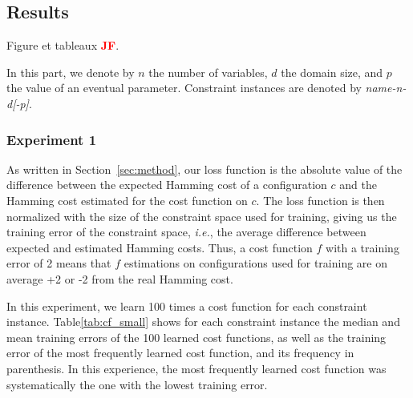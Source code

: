 \documentclass{article}
\newcommand{\ie}{\textit{i.e.}}
\newcommand{\jf}{\textcolor{red}{\bf JF}\xspace}
\begin{document}
\subsection{Results}
Figure et tableaux \jf.

In this part, we denote by $n$ the number of variables, $d$ the domain size, and $p$  the value of an eventual parameter. Constraint instances are denoted by \textit{name-n-d[-p]}.

\subsubsection{Experiment 1}


As written in  Section~\ref{sec:method}, our loss function is the absolute value of the difference between the expected Hamming cost of a  configuration $c$  and the  Hamming cost estimated for the cost function on $c$. The loss function is then normalized with the size of the constraint space used for training, giving us the training error of the constraint space, \ie,  the average difference between expected and estimated  Hamming costs.   Thus,  a  cost function $f$  with a training error of 2  means that  $f$ estimations on configurations used for training are on average +2 or -2 from the real Hamming cost.


In this experiment,  we learn 100  times a  cost function for each constraint instance. Table\ref{tab:cf_small} shows for each constraint instance the median and mean training errors of the  100 learned cost functions,  as well as the training error of the most frequently learned cost function,  and its frequency in parenthesis. In this experience,   the most frequently learned cost function was systematically the one with the lowest training error.
\end{document}

